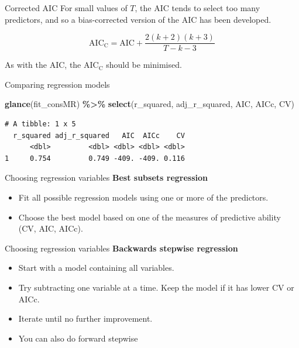 \documentclass[
  14pt,
  ignorenonframetext,
  aspectratio=169,
]{beamer}
\newenvironment{Shaded}{\begin{snugshade}}{\end{snugshade}}
\newcommand{\FunctionTok}[1]{\textcolor[rgb]{0.13,0.29,0.53}{\textbf{#1}}}
\newcommand{\NormalTok}[1]{#1}
\newcommand{\SpecialCharTok}[1]{\textcolor[rgb]{0.81,0.36,0.00}{\textbf{#1}}}
\providecommand{\tightlist}{%
  \setlength{\itemsep}{0pt}\setlength{\parskip}{0pt}}
\renewenvironment{Shaded}{\vspace*{0.15cm}\color{black}\fontsize{10}{10}\sf\begin{snugshade}\color{black}}{\end{snugshade}}
\begin{document}
\begin{frame}{Corrected AIC}
\protect{}\label{corrected-aic}
For small values of \(T\), the AIC tends to select too many predictors,
and so a bias-corrected version of the AIC has been developed.

\begin{block}{}
$$
\text{AIC}_{\text{C}} = \text{AIC} + \frac{2(k+2)(k+3)}{T-k-3}
$$
\end{block}

As with the AIC, the AIC\(_{\text{C}}\) should be minimised.
\end{frame}

\begin{frame}[fragile]{Comparing regression models}
\protect{}\label{comparing-regression-models-2}
\fontsize{12}{14}\sf

\begin{Shaded}
\begin{Highlighting}[]
\FunctionTok{glance}\NormalTok{(fit\_consMR) }\SpecialCharTok{\%\textgreater{}\%}
  \FunctionTok{select}\NormalTok{(r\_squared, adj\_r\_squared, AIC, AICc, CV)}
\end{Highlighting}
\end{Shaded}

\begin{verbatim}
# A tibble: 1 x 5
  r_squared adj_r_squared   AIC  AICc    CV
      <dbl>         <dbl> <dbl> <dbl> <dbl>
1     0.754         0.749 -409. -409. 0.116
\end{verbatim}
\end{frame}

\begin{frame}{Choosing regression variables}
\protect{}\label{choosing-regression-variables}
\textbf{Best subsets regression}

\begin{itemize}
\item
  Fit all possible regression models using one or more of the
  predictors.
\item
  Choose the best model based on one of the measures of predictive
  ability (CV, AIC, AICc).
\end{itemize}
\end{frame}

\begin{frame}{Choosing regression variables}
\protect{}\label{choosing-regression-variables-1}
\textbf{Backwards stepwise regression}

\begin{itemize}
\tightlist
\item
  Start with a model containing all variables.
\item
  Try subtracting one variable at a time. Keep the model if it has lower
  CV or AICc.
\item
  Iterate until no further improvement.
\item
  You can also do forward stepwise
\end{itemize}
\end{frame}
\end{document}
